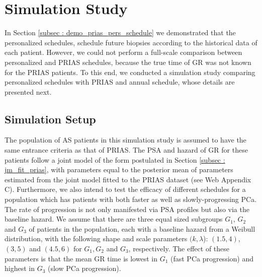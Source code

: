 \section{Simulation Study}
\label{sec: simulation_study}
In Section \ref{subsec : demo_prias_pers_schedule} we demonstrated that the personalized schedules, schedule future biopsies according to the historical data of each patient. However, we could not perform a full-scale comparison between personalized and PRIAS schedules, because the true time of GR was not known for the PRIAS patients. To this end, we conducted a simulation study comparing personalized schedules with PRIAS and annual schedule, whose details are presented next.

\subsection{Simulation Setup}
\label{subsec : simulation_setup}
The population of AS patients in this simulation study is assumed to have the same entrance criteria as that of PRIAS. The PSA and hazard of GR for these patients follow a joint model of the form postulated in Section \ref{subsec : jm_fit_prias}, with parameters equal to the posterior mean of parameters estimated from the joint model fitted to the PRIAS dataset (see Web Appendix C). Furthermore, we also intend to test the efficacy of different schedules for a population which has patients with both faster as well as slowly-progressing PCa. The rate of progression is not only manifested via PSA profiles but also via the baseline hazard. We assume that there are three equal sized subgroups $G_1$, $G_2$ and $G_3$ of patients in the population, each with a baseline hazard from a Weibull distribution, with the following shape and scale parameters $(k, \lambda$): $(1.5, 4)$, $(3, 5)$ and $(4.5, 6)$ for $G_1, G_2$ and $G_3$, respectively. The effect of these parameters is that the mean GR time is lowest in $G_1$ (fast PCa progression) and highest in $G_3$ (slow PCa progression).

